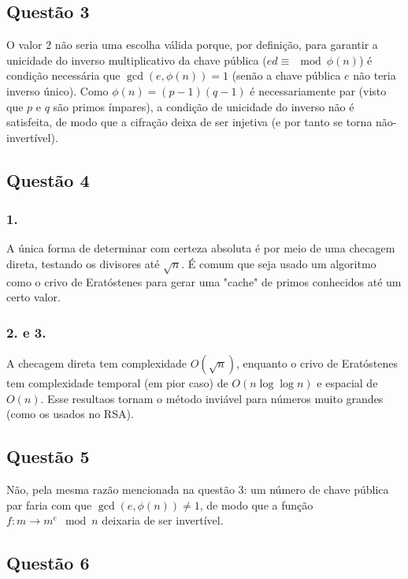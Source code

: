 \documentclass{article}
\begin{document}
\subsection*{Questão 3}

O valor 2 não seria uma escolha válida porque, por definição, para garantir a unicidade do inverso multiplicativo da chave pública ($ed \equiv \mod \phi(n)$) é condição necessária que $\gcd(e, \phi(n)) = 1$ (senão a chave pública $e$ não teria inverso único). Como $\phi(n) = (p-1)(q-1)$ é necessariamente par (visto que $p$ e $q$ são primos ímpares), a condição de unicidade do inverso não é satisfeita, de modo que a cifração deixa de ser injetiva (e por tanto se torna não-invertível).

\subsection*{Questão 4}

\subsubsection*{1.}
A única forma de determinar com certeza absoluta é por meio de uma checagem direta, testando os divisores até $\sqrt{n}$. É comum que seja usado um algoritmo como o crivo de Eratóstenes para gerar uma "cache" de primos conhecidos até um certo valor.

\subsubsection*{2. e 3.}
A checagem direta tem complexidade $O(\sqrt{n})$, enquanto o crivo de Eratóstenes tem complexidade temporal (em pior caso) de $O(n \log\log n)$ e espacial de $O(n)$. Esse resultaos tornam o método inviável para números muito grandes (como os usados no RSA).

\subsection*{Questão 5}

Não, pela mesma razão mencionada na questão 3: um número de chave pública par faria com que $\gcd(e, \phi(n)) \neq 1$, de modo que a função $f: m \rightarrow m^e \mod n$ deixaria de ser invertível.

\subsection*{Questão 6}
\end{document}
